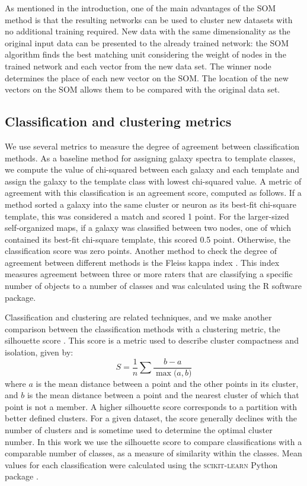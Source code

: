      As mentioned in the introduction, one of the main advantages of the SOM method is that the resulting networks can be used to cluster new datasets with no additional training required.
     New data with the same dimensionality as the original input data can be presented to the already trained network: the SOM algorithm finds the best matching unit considering the weight of nodes in the trained network and each vector from the new data set.
     The winner node determines the place of each new vector on the SOM.
     The location of the new vectors on the SOM allows them to be compared with the original data set.
     
     \subsection{Classification and clustering metrics}
     \label{sec:metrics}
     
     We use several metrics to measure the degree of agreement between classification methods. 
     As a baseline method for assigning galaxy spectra to template classes, we compute the value of chi-squared between each galaxy and each template and assign the galaxy to the template class with lowest chi-squared value. 
     A metric of agreement with this classification is an agreement score, computed as follows.
    If a method sorted a galaxy into the same cluster or neuron as its best-fit chi-square template, this was considered a match and scored 1 point. 
    For the larger-sized self-organized maps, if a galaxy was classified between two nodes, one of which contained its best-fit chi-square template, this scored 0.5 point. 
    Otherwise, the classification score was zero points.     
     Another method to check the degree of agreement between different methods is the Fleiss kappa index \citet{landis77}. 
    This index measures agreement between three or more raters that are classifying a specific number of objects to a number of classes and was calculated using the R software package.

        
        
        Classification and clustering are related techniques, and we make
        another comparison between the classification methods with a clustering metric, the silhouette score  \citep{rousseeuw87}.        
This score is a metric used to describe cluster compactness and isolation, given by:
\begin{equation}
S = \frac{1}{n} \sum{\frac{b - a}{\max\big(a, b\big)}}
\end{equation}
where $a$ is the mean distance between a point and the other points in its cluster, and $b$ is the mean distance between a point and the nearest cluster of which that point is not a member.
A higher silhouette score corresponds to a partition with better defined clusters.
For a given dataset, the score generally declines with the number of clusters and is sometime used to determine the optimal cluster number.
In this work we use the silhouette score to compare classifications with a comparable number of classes, as a measure of similarity within the classes.
Mean values for each classification were calculated using the \textsc{scikit-learn} Python package \citep{sklearn}.

     
